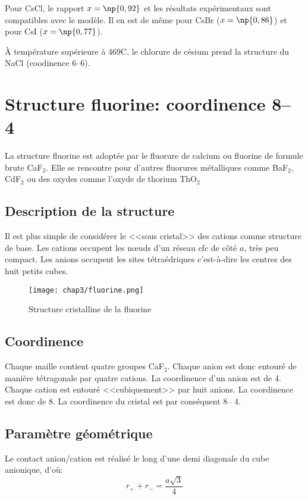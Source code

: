 \begin{rem}
    Pour CsCl, le rapport $x = \np{0,92}$ et les résultats 
    expérimentaux sont 
    compatibles avec le modèle. Il en est de même pour CsBr 
    ($x = \np{0,86}$) et pour CsI ($x = \np{0,77}$).
\end{rem}
\begin{rem}
    \`A température supérieure à 469\degre C, le chlorure de césium
    prend la structure du NaCl (coodinence 6\---6).
\end{rem}



\section{Structure fluorine: coordinence 8\--- 4}
La structure fluorine est adoptée par le fluorure de calcium ou fluorine de formule
brute CaF$_2$. Elle se rencontre pour d'autres fluorures métalliques comme
BaF$_2$, CdF$_2$ ou des oxydes comme l'oxyde de 
thorium ThO$_2$


\subsection{Description de la structure}
Il est plus simple de considérer le <<sous cristal>> des cations comme structure de base.
Les cations occupent les n\oe uds d'un réseau cfc de côté $a$, très peu compact. Les anions
occupent les sites tétraédriques c'est-à-dire les centres des huit petits cubes.
\begin{figure}
    \centering
    \texttt{[image: chap3/fluorine.png]}
    \caption{Structure cristalline de la fluorine}\label{fig:3_fluorine}
\end{figure}


\subsection{Coordinence}
Chaque maille contient quatre groupes CaF$_2$. Chaque anion est donc entouré de
manière tétragonale par quatre cations. La coordinence d'un anion est de 4.
Chaque cation est entouré <<cubiquement>> par huit anions. La coordinence est donc
de 8. La coordinence du cristal est par conséquent 8\--- 4.


\subsection{Paramètre géométrique}
Le contact anion/cation est réalisé le long d'une demi diagonale du cube anionique,
d'où:
\begin{equation}
    r_+ + r_- = \frac{a\sqrt{3}}{4}
    \label{eq:3_caf2_r+r-a}
\end{equation}


